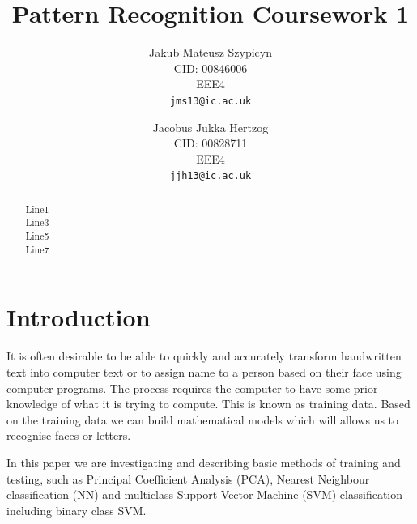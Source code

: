 \documentclass[10pt,twocolumn,letterpaper]{article}
\begin{document}
\title{Pattern Recognition Coursework 1}

\author{Jakub Mateusz Szypicyn\\
CID: 00846006\\
EEE4\\
{\tt\small jms13@ic.ac.uk}
\and
Jacobus Jukka Hertzog\\
CID: 00828711\\
EEE4\\
{\tt\small jjh13@ic.ac.uk}
}

\maketitle

\begin{abstract}

Line1\\

Line3\\

Line5\\

Line7\\

\end{abstract}

\section{Introduction}

It is often desirable to be able to quickly and accurately transform handwritten text into computer text or to assign name to a person based on their face using computer programs. The process requires the computer to have some prior knowledge of what it is trying to compute. This is known as training data. Based on the training data we can build mathematical models which will allows us to recognise faces or letters.

In this paper we are investigating and describing basic methods of training and testing, such as Principal Coefficient Analysis (PCA), Nearest Neighbour classification (NN) and multiclass Support Vector Machine (SVM) classification including binary class SVM. 
\end{document}

